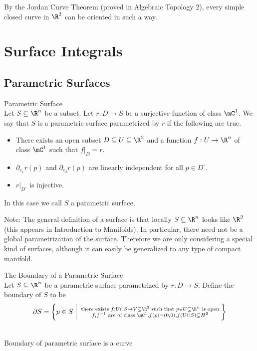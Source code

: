 \documentclass[a4paper]{article}
\begin{document}
By the Jordan Curve Theorem (proved in Algebraic Topology 2), every simple closed curve in $\R^2$ can be oriented in such a way. 

\pagebreak
\section{Surface Integrals}
\subsection{Parametric Surfaces}
\begin{defn}{Parametric Surface}{}\\
Let $S\subseteq\R^n$ be a subset. Let $r:D\to S$ be a surjective function of class $\mC^1$. We say that $S$ is a parametric surface parametrized by $r$ if the following are true. 
\begin{itemize}
\item There exists an open subset $D\subseteq U\subseteq\R^2$ and a function $f:U\to\R^n$ of class $\mC^1$ such that $f|_D=r$. 
\item $\partial_{e_1}r(p)$ and $\partial_{e_2}r(p)$ are linearly independent for all $p\in D^\circ$. 
\item $r|_{D^\circ}$ is injective. 
\end{itemize}
In this case we call $S$ a parametric surface. 
\end{defn}

Note: The general definition of a surface is that locally $S\subseteq\R^n$ looks like $\R^2$ (this appears in Introduction to Manifolds). In particular, there need not be a global parametrization of the surface. Therefore we are only considering a special kind of surfaces, although it can easily be generalized to any type of compact manifold. 

\begin{defn}{The Boundary of a Parametric Surface}{}\\
Let $S\subseteq\R^n$ be a parametric surface parametrized by $r:D\to S$. Define the boundary of $S$ to be $$\partial S=\left\{p\in S\;\bigg{|}\;\substack{\text{ there exists }f:U\cap S\to V\subseteq\R^2\text{ such that }p\in U\subseteq\R^n\text{ is open }\\f,f^{-1}\text{ are of class }\mC^1,f(p)=(0,0), f(U\cap S)\subseteq H^2}\right\}$$
\end{defn}

\begin{lmm}{}{}\\
Boundary of parametric surface is a curve
\end{lmm}
\end{document}
